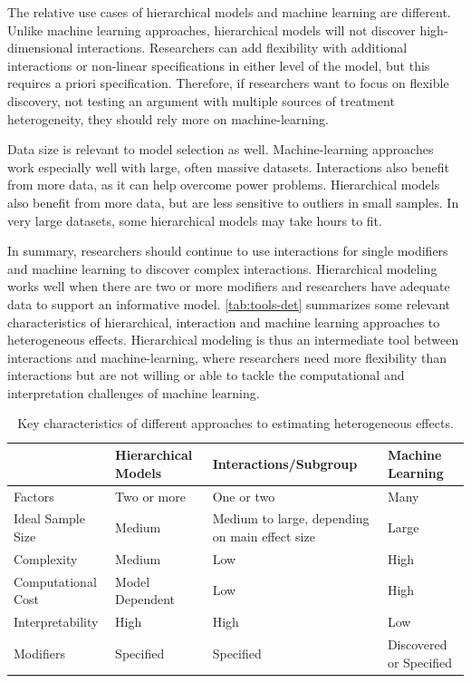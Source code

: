 \documentclass[12pt]{article}
\begin{document}
The relative use cases of hierarchical models and machine learning are different. 
Unlike machine learning approaches, hierarchical models will not discover high-dimensional interactions. 
Researchers can add flexibility with additional interactions or non-linear specifications in either level of the model, but this requires a priori specification. 
Therefore, if researchers want to focus on flexible discovery, not testing an argument with multiple sources of treatment heterogeneity, they should rely more on machine-learning. 


Data size is relevant to model selection as well. 
Machine-learning approaches work especially well with large, often massive datasets. 
Interactions also benefit from more data, as it can help overcome power problems. 
Hierarchical models also benefit from more data, but are less sensitive to outliers in small samples. 
In very large datasets, some hierarchical models may take hours to fit. 


In summary, researchers should continue to use interactions for single modifiers and machine learning to discover complex interactions. 
Hierarchical modeling works well when there are two or more modifiers and researchers have adequate data to support an informative model.  
\autoref{tab:tools-det} summarizes some relevant characteristics of hierarchical, interaction and machine learning approaches to heterogeneous effects. 
Hierarchical modeling is thus an intermediate tool between interactions and machine-learning, where researchers need more flexibility than interactions but are not willing or able to tackle the computational and interpretation challenges of machine learning. 


\begin{table}
\begin{tabular}{|p{1in}|p{1.5in}|p{1.5in}|p{1.5in}|} \hline
                 & Hierarchical Models & Interactions/Subgroup & Machine Learning \\
\hline
Factors              & Two or more          & One or two         & Many \\ \hline
Ideal Sample Size          & Medium            & Medium to large, depending on main effect size    & Large \\ \hline
Complexity           & Medium             & Low                & High \\ \hline
Computational Cost   & Model Dependent             & Low                & High \\ \hline
Interpretability     & High               & High               & Low \\ \hline
Modifiers            & Specified          & Specified      & Discovered or Specified \\
\hline
\end{tabular}
\caption{Key characteristics of different approaches to estimating heterogeneous effects.}
\label{tab:tools-det}
\end{table}
\end{document}
